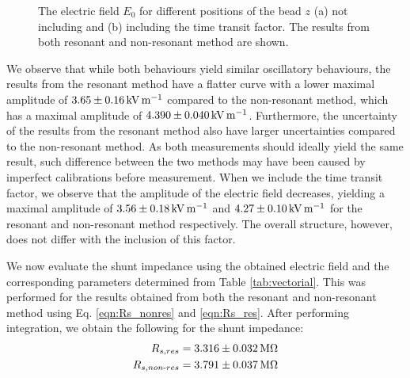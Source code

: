 \documentclass[a4paper]{report}
\numberwithin{equation}{section}
\begin{document}
\begin{figure}[htb!]
	\centering
	\quad

	\caption{The electric field $E_0$ for different positions of the bead $z$ (a) not including and 
			(b) including the time transit factor. The results from both resonant and non-resonant method are shown.}
	\label{fig:E0}
\end{figure}

We observe that while both behaviours yield similar oscillatory behaviours, the results from the resonant method have a 
flatter curve with a lower maximal amplitude of $\SI{3.65 \pm 0.16}{\kilo\volt\per\metre}$ compared to the non-resonant method, which has
a maximal amplitude of $\SI{4.390 \pm 0.040}{\kilo\volt\per\metre}$. Furthermore, the uncertainty of the results from the resonant
method also have larger uncertainties compared to the non-resonant method. As both measurements should ideally yield the same result,
such difference between the two methods may have been caused by imperfect calibrations before measurement. When we include the time transit factor,
 we observe that the amplitude of the electric field decreases, yielding a maximal amplitude of  $\SI{3.56 \pm 0.18}{\kilo\volt\per\metre}$
 and $\SI{4.27 +- 0.10}{\kilo\volt\per\metre}$ for the resonant and non-resonant method respectively. The overall structure, however,
 does not differ with the inclusion of this factor.\par 

We now evaluate the shunt impedance using the obtained electric field and the corresponding parameters determined from Table \ref{tab:vectorial}.
This was performed for the results obtained from both the resonant and non-resonant method using Eq. \ref{eqn:Rs_nonres} and \ref{eqn:Rs_res}.
After performing integration, we obtain the following for the shunt impedance:
\begin{align*}
	R_{s, res} = \SI{3.316 \pm 0.032}{\mega\ohm} \\
	R_{s, non\text{-}res} = \SI{3.791 \pm 0.037}{\mega\ohm}
\end{align*}
\end{document}
